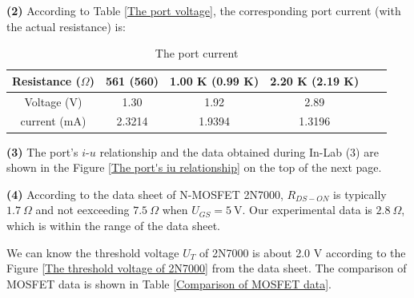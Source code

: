 \documentclass[UTF8]{report}
\theoremstyle{MyLineTheoremStyle} %
\theoremstyle{MyBlockTheoremStyle} %
\theoremstyle{MySubsubsectionStyle} %
\begin{document}
\noindent\textbf{(2)}
According to Table \ref{The port voltage}, the corresponding port current (with the actual resistance) is:

\begin{table}[H]\centering
    \caption{The port current}
    \label{The port current}
\begin{tabular}{cccccc}\hline
    Resistance ($\Omega$) & 561 (560) & 1.00 K (0.99 K) & 2.20 K (2.19 K) \\
    \hline
    Voltage (V) & 1.30 & 1.92 & 2.89 \\
    current (mA) & 2.3214 & 1.9394 &  1.3196 \\
    \hline
\end{tabular}
\end{table}

\noindent\textbf{(3)}
The port's $i$-$u$ relationship and the data obtained during In-Lab (3) are shown in the Figure \ref{The port's iu relationship} on the top of the next page.

\noindent\textbf{(4)}
According to the data sheet of N-MOSFET 2N7000, $R_{DS-ON}$ is typically $1.7 \ \Omega$ and not eexceeding $7.5 \ \Omega$ when $U_{GS} = 5 \ \mathrm{V}$. Our experimental data is $2.8 \ \Omega$, which is within the range of the data sheet. 

We can know the threshold voltage $U_T$ of 2N7000 is about 2.0 V according to the Figure \ref{The threshold voltage of 2N7000} from the data sheet. The comparison of MOSFET data is shown in Table \ref{Comparison of MOSFET data}.
\end{document}
